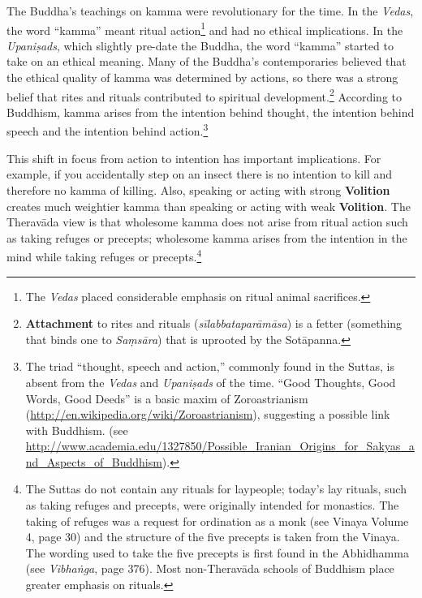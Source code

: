The Buddha’s teachings on kamma were revolutionary for the time. In the \textit{Vedas}, the word “kamma” meant ritual action\footnote{The \textit{Vedas} placed considerable emphasis on ritual animal sacrifices.} and had no ethical implications. In the \textit{Upaniṣads}, which slightly pre-date the Buddha, the word “kamma” started to take on an ethical meaning. Many of the Buddha’s contemporaries believed that the ethical quality of kamma was determined by actions, so there was a strong belief that rites and rituals contributed to spiritual development.\footnote{\textbf{Attachment} to rites and rituals (\textit{sīlabbataparāmāsa}) is a fetter (something that binds one to \textit{Saṃsāra}) that is uprooted by the Sotāpanna.} According to Buddhism, kamma arises from the intention behind thought, the intention behind speech and the intention behind action.\footnote{The triad “thought, speech and action,” commonly found in the Suttas, is absent from the \textit{Vedas} and \textit{Upaniṣads} of the time. “Good Thoughts, Good Words, Good Deeds” is a basic maxim of Zoroastrianism (\url{http://en.wikipedia.org/wiki/Zoroastrianism}), suggesting a possible link with Buddhism. (see\\
\url{http://www.academia.edu/1327850/Possible_Iranian_Origins_for_Sakyas_and_Aspects_of_Buddhism}).}

\pagebreak

This shift in focus from action to intention has important implications. For example, if you accidentally step on an insect there is no intention to kill and therefore no kamma of killing. Also, speaking or acting with strong \textbf{Volition} creates much weightier kamma than speaking or acting with weak \textbf{Volition}. The Theravāda view is that wholesome kamma does not arise from ritual action such as taking refuges or precepts; wholesome kamma arises from the intention in the mind while taking refuges or precepts.\footnote{The Suttas do not contain any rituals for laypeople; today’s lay rituals, such as taking refuges and precepts, were originally intended for monastics. The taking of refuges was a request for ordination as a monk (see Vinaya Volume 4, page 30) and the structure of the five precepts is taken from the Vinaya. The wording used to take the five precepts is first found in the Abhidhamma (see \textit{Vibhaṅga}, page 376). Most non-Theravāda schools of Buddhism place greater emphasis on rituals.}

